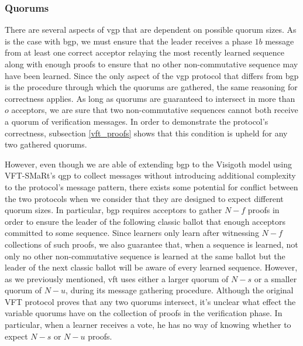 \subsubsection{Quorums}
There are several aspects of \acrshort{vgp} that are dependent on possible quorum sizes. As is the case with \acrshort{bgp}, we must ensure that the leader receives a phase $1b$ message from at least one correct acceptor relaying the most recently learned sequence along with enough proofs to ensure that no other non-commutative sequence may have been learned. Since the only aspect of the \acrshort{vgp} protocol that differs from \acrshort{bgp} is the procedure through which the quorums are gathered, the same reasoning for correctness applies. As long as quorums are guaranteed to intersect in more than $o$ acceptors, we are sure that two non-commutative sequences cannot both receive a quorum of verification messages. In order to demonstrate the protocol's correctness, subsection \ref{vft_proofs} shows that this condition is upheld for any two gathered quorums. \par
However, even though we are able of extending \acrshort{bgp} to the Visigoth model using VFT-SMaRt's \acrshort{qgp} to collect messages without introducing additional complexity to the protocol's message pattern, there exists some potential for conflict between the two protocols when we consider that they are designed to expect different quorum sizes. In particular, \acrshort{bgp} requires acceptors to gather $N-f$ proofs in order to ensure the leader of the following classic ballot that enough acceptors committed to some sequence. Since learners only learn after witnessing $N-f$ collections of such proofs, we also guarantee that, when a sequence is learned, not only no other non-commutative sequence is learned at the same ballot but the leader of the next classic ballot will be aware of every learned sequence. However, as we previously mentioned, \acrshort{vft} uses either a larger quorum of $N-s$ or a smaller quorum of $N-u$, during its message gathering procedure. Although the original VFT protocol proves that any two quorums intersect, it's unclear what effect the variable quorums have on the collection of proofs in the verification phase. In particular, when a learner receives a vote, he has no way of knowing whether to expect $N-s$ or $N-u$ proofs. \par 
